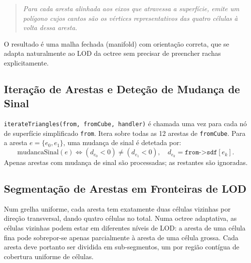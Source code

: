 \documentclass[10pt,a4paper]{article}
\begin{document}
\begin{quote}
  \emph{Para cada aresta alinhada aos eixos que atravessa a
  superfície, emite um polígono cujos cantos são os vértices
  representativos das quatro células à volta dessa aresta.}
\end{quote}

\noindent O resultado é uma malha fechada (manifold) com orientação
correta, que se adapta naturalmente ao LOD da octree sem precisar de
preencher rachas explicitamente.

\subsection{Iteração de Arestas e Deteção de Mudança de Sinal}

\lstinline{iterateTriangles(from, fromCube, handler)} é chamada uma
vez para cada nó de superfície simplificado \lstinline{from}. Itera
sobre todas as 12 arestas de \lstinline{fromCube}. Para a aresta
$e = \{e_0, e_1\}$, uma mudança de sinal é detetada por:
\[
  \text{mudancaSinal}(e) \iff
    (d_{e_0} < 0) \neq (d_{e_1} < 0),
  \quad
  d_{e_k} = \texttt{from->sdf}[e_k].
\]
Apenas arestas com mudança de sinal são processadas; as restantes
são ignoradas.

\subsection{Segmentação de Arestas em Fronteiras de LOD}
\label{sec:itriangles:segseg}

Num grelha uniforme, cada aresta tem exatamente duas células vizinhas
por direção transversal, dando quatro células no total. Numa octree
adaptativa, as células vizinhas podem estar em diferentes níveis de
LOD: a aresta de uma célula fina pode sobrepor-se apenas parcialmente
à aresta de uma célula grossa. Cada aresta deve portanto ser dividida
em sub-segmentos, um por região contígua de cobertura uniforme de
células.
\end{document}
